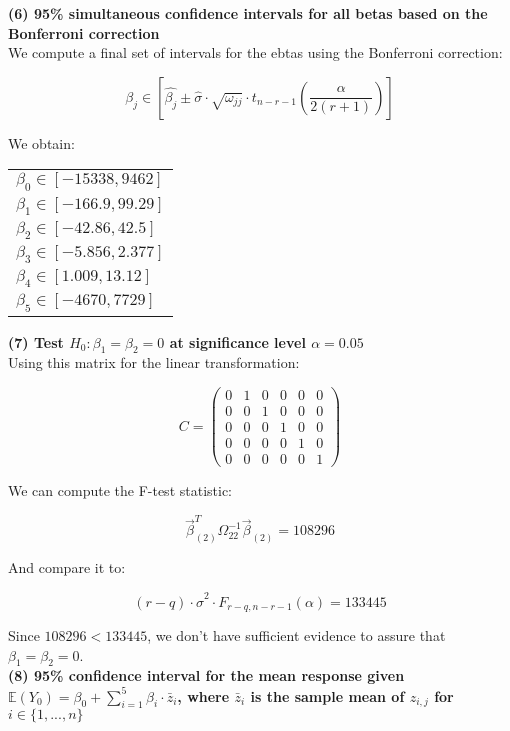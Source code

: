 \documentclass[11pt,a4paper]{article}
\begin{document}
	\textbf{(6) 95\% simultaneous confidence intervals for all betas based on the Bonferroni correction} \\
	
	We compute a final set of intervals for the ebtas using the Bonferroni correction:
	
	$$ \beta_j \in [ \hat{\beta_j} \pm \hat{\sigma} \cdot \sqrt{\omega_{jj}} \cdot t_{n-r-1}(\frac{\alpha}{2(r+1)}) ] $$
	
	We obtain:
	
	\begin{table}[H] \centering
		\begin{tabular}{l}
			$\beta_0 \in [ -15338 , 9462 ]$ \\
			$\beta_1 \in [ -166.9 , 99.29 ]$ \\
			$\beta_2 \in [ -42.86 , 42.5 ]$ \\
			$\beta_3 \in [ -5.856 , 2.377 ]$ \\
			$\beta_4 \in [ 1.009 , 13.12 ]$ \\
			$\beta_5 \in [ -4670 , 7729 ]$
		\end{tabular}
	\end{table}
	
	\textbf{(7) Test $H_0: \beta_1 = \beta_2 = 0 $ at significance level $\alpha = 0.05$} \\
	
	Using this matrix for the linear transformation:
	
	$$ C = 
	\begin{pmatrix}
		0 & 1 & 0 & 0 & 0 & 0 \\
		0 & 0 & 1 & 0 & 0 & 0 \\
		0 & 0 & 0 & 1 & 0 & 0 \\
		0 & 0 & 0 & 0 & 1 & 0 \\
		0 & 0 & 0 & 0 & 0 & 1
	\end{pmatrix}
	$$
	
	We can compute the F-test statistic:
	
	$$ \vec{\beta}^T_{(2)} \Omega_{22}^{-1} \vec{\beta}_{(2)} = 108296 $$
	
	And compare it to:
	
	$$ (r-q) \cdot \hat{\sigma}^2 \cdot F_{r-q,n-r-1}(\alpha) = 133445 $$
	
	Since $108296 < 133445$, we don't have sufficient evidence to assure that $\beta_1 = \beta_2 = 0$. \\
	
	\textbf{(8) 95\% confidence interval for the mean response given $\mathds{E}(Y_0) = \beta_0 + \sum_{i=1}^{5} \beta_i \cdot \bar{z}_i$, where $\bar{z}_i$ is the sample mean of $z_{i,j}$ for $i \in \{1, ..., n\}$} \\
	
\end{document}
